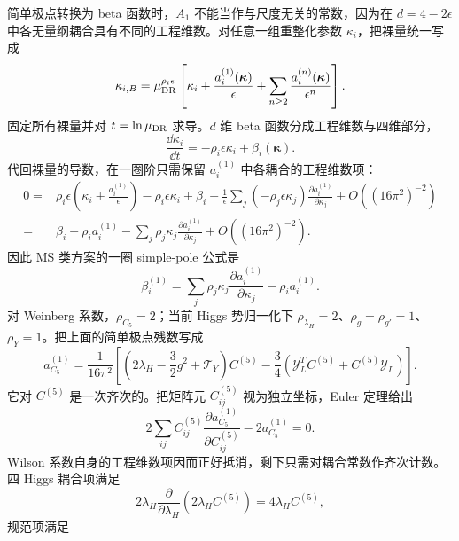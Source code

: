\begin{derivation}
简单极点转换为 beta 函数时，$A_1$ 不能当作与尺度无关的常数，因为在 $d=4-2\epsilon$ 中各无量纲耦合具有不同的工程维数。对任意一组重整化参数 $\kappa_i$，把裸量统一写成
\begin{equation*}
 \kappa_{i,B}=\mu_{\rm DR}^{\rho_i\epsilon}
 \left[\kappa_i+\frac{a_i^{(1)}(\boldsymbol\kappa)}{\epsilon}
 +\sum_{n\ge2}\frac{a_i^{(n)}(\boldsymbol\kappa)}{\epsilon^n}\right].
\end{equation*}
固定所有裸量并对 $t=\ln\mu_{\rm DR}$ 求导。$d$ 维 beta 函数分成工程维数与四维部分，
\begin{equation*}
 \frac{\dd\kappa_i}{\dd t}
 =-\rho_i\epsilon\kappa_i+\beta_i(\boldsymbol\kappa).
\end{equation*}
代回裸量的导数，在一圈阶只需保留 $a_i^{(1)}$ 中各耦合的工程维数项：
\begin{align*}
0={}&\rho_i\epsilon
 \left(\kappa_i+\frac{a_i^{(1)}}{\epsilon}\right)
 -\rho_i\epsilon\kappa_i+\beta_i
 +\frac1\epsilon\sum_j
 \left(-\rho_j\epsilon\kappa_j\right)
 \frac{\partial a_i^{(1)}}{\partial\kappa_j}
 +O((16\pi^2)^{-2})\\
={}&\beta_i+\rho_i a_i^{(1)}
 -\sum_j\rho_j\kappa_j
 \frac{\partial a_i^{(1)}}{\partial\kappa_j}
 +O((16\pi^2)^{-2}).
\end{align*}
因此 MS 类方案的一圈 simple-pole 公式是
\begin{equation*}
 \beta_i^{(1)}=
 \sum_j\rho_j\kappa_j
 \frac{\partial a_i^{(1)}}{\partial\kappa_j}
 -\rho_i a_i^{(1)}.
\end{equation*}
对 Weinberg 系数，$\rho_{C_5}=2$；当前 Higgs 势归一化下
$\rho_{\lambda_H}=2$、$\rho_g=\rho_{g'}=1$、$\rho_Y=1$。把上面的简单极点残数写成
\begin{equation*}
 a_{C_5}^{(1)}=\frac1{16\pi^2}\left[
 \left(2\lambda_H-\frac32g^2+\mathcal T_Y\right)C^{(5)}
 -\frac34\left(\mathcal Y_L^TC^{(5)}+C^{(5)}\mathcal Y_L\right)
 \right].
\end{equation*}
它对 $C^{(5)}$ 是一次齐次的。把矩阵元 $C^{(5)}_{ij}$ 视为独立坐标，Euler 定理给出
\begin{equation*}
 2\sum_{ij}C^{(5)}_{ij}
 \frac{\partial a_{C_5}^{(1)}}{\partial C^{(5)}_{ij}}
 -2a_{C_5}^{(1)}=0.
\end{equation*}
Wilson 系数自身的工程维数项因而正好抵消，剩下只需对耦合常数作齐次计数。四 Higgs 耦合项满足
\begin{equation*}
 2\lambda_H\frac{\partial}{\partial\lambda_H}
 \left(2\lambda_H C^{(5)}\right)=4\lambda_H C^{(5)},
\end{equation*}
规范项满足
\begin{equation*}

\end{equation*}
\end{derivation}
